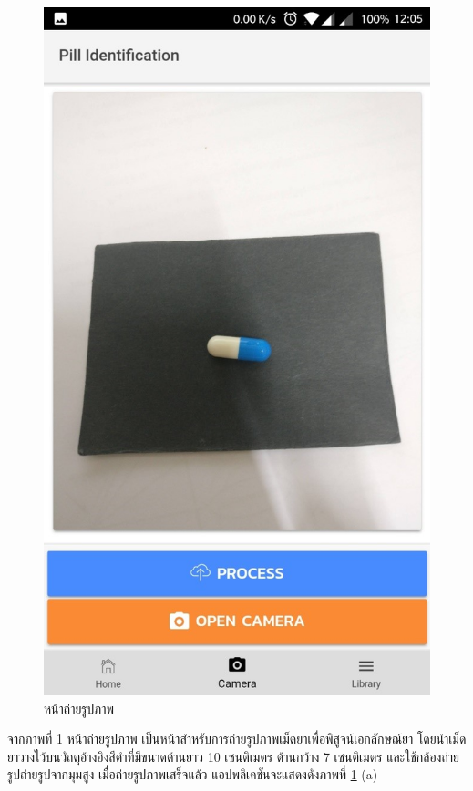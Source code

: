 \begin{figure}[H]
    \centering\includegraphics[scale=0.9]{Figures/7/18}
    \caption{หน้าถ่ายรูปภาพ}
    \label{Fig:howto5}
\end{figure}

จากภาพที่ \ref{Fig:howto5} หน้าถ่ายรูปภาพ 
เป็นหน้าสำหรับการถ่ายรูปภาพเม็ดยาเพื่อพิสูจน์เอกลักษณ์ยา 
โดยนำเม็ดยาวางไว้บนวัถตุอ้างอิงสีดำที่มีขนาดด้านยาว 10 เซนติเมตร ด้านกว้าง 7 เซนติเมตร 
และใช้กล้องถ่ายรูปถ่ายรูปจากมุมสูง เมื่อถ่ายรูปภาพเสร็จแล้ว 
แอปพลิเคชันจะแสดงดังภาพที่ \ref{Fig:howto5} (a)

